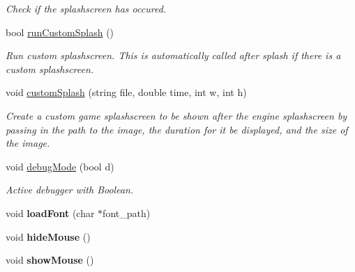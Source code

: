 \begin{DoxyCompactItemize}
\begin{DoxyCompactList}\small\item\em Check if the splashscreen has occured. \end{DoxyCompactList}\item 
bool \hyperlink{classEngine_a5c87c90c9dd6b3fd652e24af0c7e935d}{run\+Custom\+Splash} ()\hypertarget{classEngine_a5c87c90c9dd6b3fd652e24af0c7e935d}{}\label{classEngine_a5c87c90c9dd6b3fd652e24af0c7e935d}

\begin{DoxyCompactList}\small\item\em Run custom splashscreen. This is automatically called after splash if there is a custom splashscreen. \end{DoxyCompactList}\item 
void \hyperlink{classEngine_a0960e415d0b9ed92099eee6677d7ea51}{custom\+Splash} (string file, double time, int w, int h)\hypertarget{classEngine_a0960e415d0b9ed92099eee6677d7ea51}{}\label{classEngine_a0960e415d0b9ed92099eee6677d7ea51}

\begin{DoxyCompactList}\small\item\em Create a custom game splashscreen to be shown after the engine splashscreen by passing in the path to the image, the duration for it be displayed, and the size of the image. \end{DoxyCompactList}\item 
void \hyperlink{classEngine_a60d5307c4bc5005119086ff9f3e21624}{debug\+Mode} (bool d)\hypertarget{classEngine_a60d5307c4bc5005119086ff9f3e21624}{}\label{classEngine_a60d5307c4bc5005119086ff9f3e21624}

\begin{DoxyCompactList}\small\item\em Active debugger with Boolean. \end{DoxyCompactList}\item 
void {\bfseries load\+Font} (char $\ast$font\+\_\+path)\hypertarget{classEngine_a4be41373ed9a4b0d14f256ce777a2c3d}{}\label{classEngine_a4be41373ed9a4b0d14f256ce777a2c3d}

\item 
void {\bfseries hide\+Mouse} ()\hypertarget{classEngine_ab28645d6809f5335cc9034caaba38827}{}\label{classEngine_ab28645d6809f5335cc9034caaba38827}

\item 
void {\bfseries show\+Mouse} ()\hypertarget{classEngine_a6d476e93e46e59543ea9714b93a30936}{}\label{classEngine_a6d476e93e46e59543ea9714b93a30936}


\end{DoxyCompactItemize}
